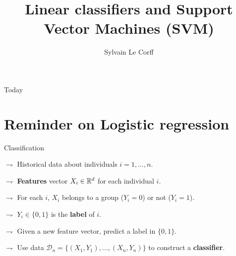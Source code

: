 \documentclass[xcolor={usenames,dvipsnames}]{beamer}
\begin{document}
\title[]{Linear classifiers and Support Vector Machines (SVM)}
\author[S.~Le Corff]{Sylvain Le Corff}
\date{}

\begin{frame}[plain]
\titlepage
\end{frame}

\begin{frame}{Today}
\setcounter{tocdepth}{1}
\tableofcontents
\end{frame}





\section{Reminder on Logistic regression}

\begin{frame}{Classification}


$\rightharpoondown$ Historical data  about \alert{individuals $i=1, \ldots, n$}.

\vspace{.1cm}

$\rightharpoondown$ \textbf{Features} vector $X_i \in \mathbb{R}^d$ for each individual $i$.

\vspace{.1cm}

$\rightharpoondown$ For each $i$, $X_i$ \alert{belongs to a group} ($Y_i = 0$) or not ($Y_i = 1$).

\vspace{.1cm}

$\rightharpoondown$ $Y_i \in \{ 0, 1 \}$ is  the \textbf{label} of $i$.


\vspace{.6cm}


$\rightharpoondown$ Given a new feature vector, \alert{predict a label in $\{ 0, 1 \}$}.

\vspace{.2cm}

$\rightharpoondown$ Use data $\mathcal{D}_n = \{ (X_1, Y_1), \ldots, (X_n, Y_n) \}$ \alert{to construct a  \textbf{classifier}}.

\end{frame}
\end{document}
